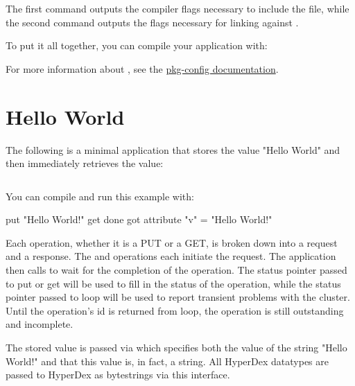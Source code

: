 The first command outputs the compiler flags necessary to include the
 file, while the second command outputs the flags
necessary for linking against .

To put it all together, you can compile your application with:

\begin{consolecode}
\end{consolecode}

For more information about , see the
\href{http://people.freedesktop.org/~dbn/pkg-config-guide.html#using}{pkg-config
documentation}.

\section{Hello World}
\label{sec:api:c:client:helloworld}

The following is a minimal application that stores the value "Hello World" and
then immediately retrieves the value:

\inputminted{c}{\topdir/c/client/hello-world.c}

You can compile and run this example with:

\begin{consolecode}
put "Hello World!"
get done
got attribute "v" = "Hello World!"
\end{consolecode}

Each operation, whether it is a PUT or a GET, is broken down into a request and
a response.  The  and 
operations each initiate the request.  The application then calls
 to wait for the completion of the operation.  The
status pointer passed to put or get will be used to fill in the status of the
operation, while the status pointer passed to loop will be used to report
transient problems with the cluster.  Until the operation's id is returned from
loop, the operation is still outstanding and incomplete.

The stored value is passed via  which
specifies both the value of the string "Hello World!" and that this value is, in
fact, a string.  All HyperDex datatypes are passed to HyperDex as bytestrings
via this interface.


